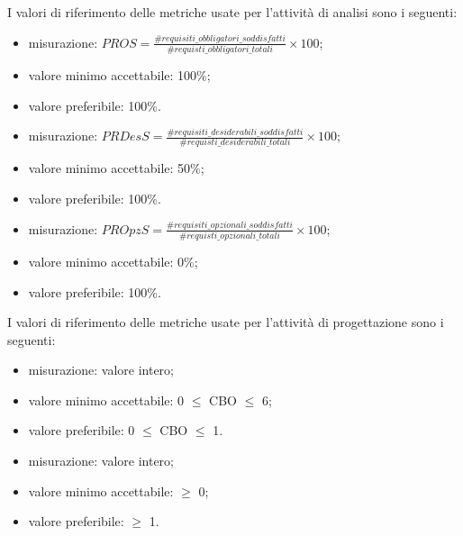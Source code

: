 		I valori di riferimento delle metriche usate per l'attività di analisi sono i seguenti:
				\begin{itemize}
					\item{misurazione: $PROS = \displaystyle\frac{\#requisiti\_obbligatori\_soddisfatti}{\#requisti\_obbligatori\_totali} \times 100$;}
					\item{valore minimo accettabile: 100\%;}
					\item{valore preferibile: 100\%.}
				\end{itemize}
				\begin{itemize}
					\item{misurazione: $PRDesS = \displaystyle\frac{\#requisiti\_desiderabili\_soddisfatti}{\#requisti\_desiderabili\_totali} \times 100$;}
					\item{valore minimo accettabile: 50\%;}
					\item{valore preferibile: 100\%.}
				\end{itemize}
				\begin{itemize}
					\item{misurazione: $PROpzS = \displaystyle\frac{\#requisiti\_opzionali\_soddisfatti}{\#requisti\_opzionali\_totali} \times 100$;}
					\item{valore minimo accettabile: 0\%;}
					\item{valore preferibile: 100\%.}
				\end{itemize}

		I valori di riferimento delle metriche usate per l'attività di progettazione sono i seguenti:
		
				\begin{itemize}
					\item{misurazione: valore intero;}
					\item{valore minimo accettabile: 0 $\leq$ CBO $\leq$ 6;}
					\item{valore preferibile: 0 $\leq$ CBO $\leq$ 1.}
				\end{itemize}

		
				\begin{itemize}
					\item{misurazione: valore intero;}
					\item{valore minimo accettabile: $\geq$ 0;}
					\item{valore preferibile: $\geq$ 1.}
				\end{itemize}
	
